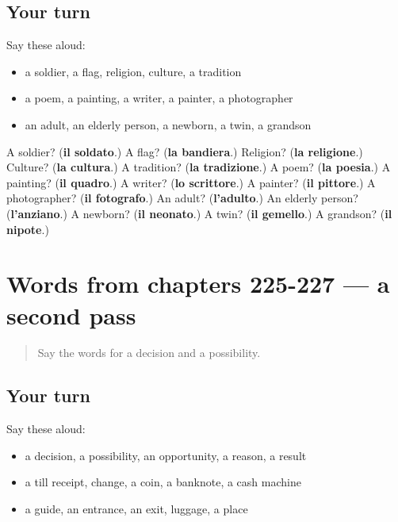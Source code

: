 \subsection*{Your turn}
Say these aloud:

\begin{itemize}
\raggedright
  \item a soldier, a flag, religion, culture, a tradition
  \item a poem, a painting, a writer, a painter, a photographer
  \item an adult, an elderly person, a newborn, a twin, a grandson
\end{itemize}

\begin{tcolorbox}[breakable,colback=teal!4,colframe=teal!35!black,title={Before you move on}]
A soldier? (\textbf{il soldato}.) A flag? (\textbf{la bandiera}.) Religion? (\textbf{la religione}.) Culture? (\textbf{la cultura}.) A tradition? (\textbf{la tradizione}.) A poem? (\textbf{la poesia}.) A painting? (\textbf{il quadro}.) A writer? (\textbf{lo scrittore}.) A painter? (\textbf{il pittore}.) A photographer? (\textbf{il fotografo}.) An adult? (\textbf{l'adulto}.) An elderly person? (\textbf{l'anziano}.) A newborn? (\textbf{il neonato}.) A twin? (\textbf{il gemello}.) A grandson? (\textbf{il nipote}.)
\end{tcolorbox}
\section[(dialogue)]{Words from chapters 225-227 — a second pass}

\label{lesson:IT-R227-second-pass-words-from-chapters-225-227}



\begin{quote}
Say the words for a decision and a possibility.
\end{quote}

\subsection*{Your turn}
Say these aloud:

\begin{itemize}
\raggedright
  \item a decision, a possibility, an opportunity, a reason, a result
  \item a till receipt, change, a coin, a banknote, a cash machine
  \item a guide, an entrance, an exit, luggage, a place
\end{itemize}


